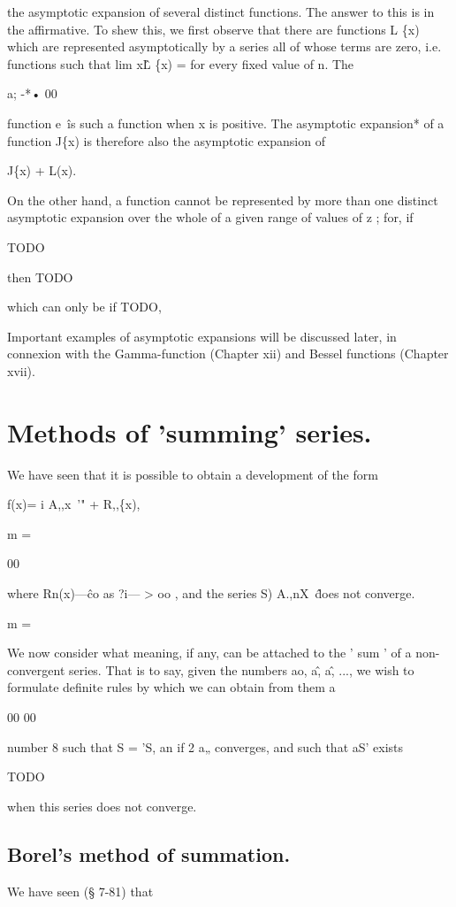 %
%

the asymptotic expansion of several distinct functions. The answer to
this is in the affirmative. To shew this, we first observe that there
are functions L \{x) which are represented asymptotically by a series
all of whose terms are zero, i.e. functions such that lim x\^L \{x) =
for every fixed value of n. The 

a; -*• 00

function e~\^ is such a function when x is positive. The asymptotic
expansion* of a function J\{x) is therefore also the asymptotic
expansion of

J\{x) + L(x).

On the other hand, a function cannot be represented by more than one
distinct asymptotic expansion over the whole of a given range of
values of z ; for, if 

TODO

then TODO

which can only be if TODO,

Important examples of asymptotic expansions will be discussed later,
in connexion with the Gamma-function (Chapter xii) and Bessel functions (Chapter xvii).

\section{Methods of 'summing' series.}

We have seen that it is possible to obtain a development of the form

f(x)= i A,,x~'" + R,,\{x),

m =

00

where Rn(x)—\^ co as ?i— > oo , and the series S) A.,nX~\^ does not converge.

m =

We now consider what meaning, if any, can be attached to the ' sum '
of a non- convergent series. That is to say, given the numbers ao,
a\^, a\^, ..., we wish to formulate definite rules by which we can
obtain from them a 

00 00

number 8 such that S = 'S, an if 2 a„ converges, and such that aS' exists

TODO

when this series does not converge.

\subsection{Borel's method of summation.}
We have seen (§ 7-81) that

